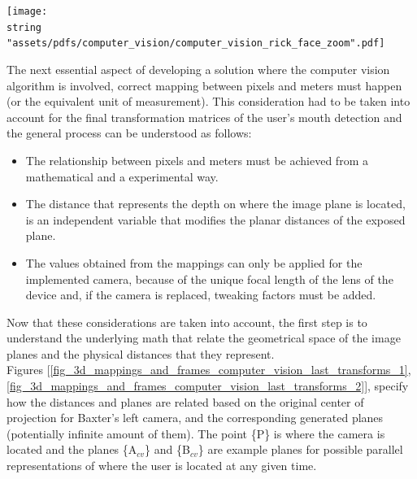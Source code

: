 \documentclass[11pt]{report} %
\begin{document}
\begin{center}
\texttt{[image: \\string "assets/pdfs/computer\_vision/computer\_vision\_rick\_face\_zoom".pdf]}
\bigbreak
\begin{minipage}{\linewidth} %
\label{fig_rick_face_zoom}
\end{minipage} \end{center}


The next essential aspect of developing a solution where the computer vision algorithm is involved, correct mapping between pixels and meters must happen (or the equivalent unit of measurement). This consideration had to be taken into account for the final transformation matrices of the user's mouth detection and the general process can be understood as follows:

\begin{itemize}
    \item The relationship between pixels and meters must be achieved from a mathematical and a experimental way.
    \item The distance that represents the depth on where the image plane is located, is an independent variable that modifies the planar distances of the exposed plane.
    \item The values obtained from the mappings can only be applied for the implemented camera, because of the unique focal length of the lens of the device and, if the camera is replaced, tweaking factors must be added.
\end{itemize}

Now that these considerations are taken into account, the first step is to understand the underlying math that relate the geometrical space of the image planes and the physical distances that they represent.\\

Figures [\ref{fig_3d_mappings_and_frames_computer_vision_last_transforms_1}, \ref{fig_3d_mappings_and_frames_computer_vision_last_transforms_2}], specify how the distances and planes are related based on the original center of projection for Baxter's left camera, and the corresponding generated planes (potentially infinite amount of them). The point \{P\} is where the camera is located and the planes \{A$_{cv}$\} and \{B$_{cv}$\} are example planes for possible parallel representations of where the user is located at any given time.\\
\end{document}
